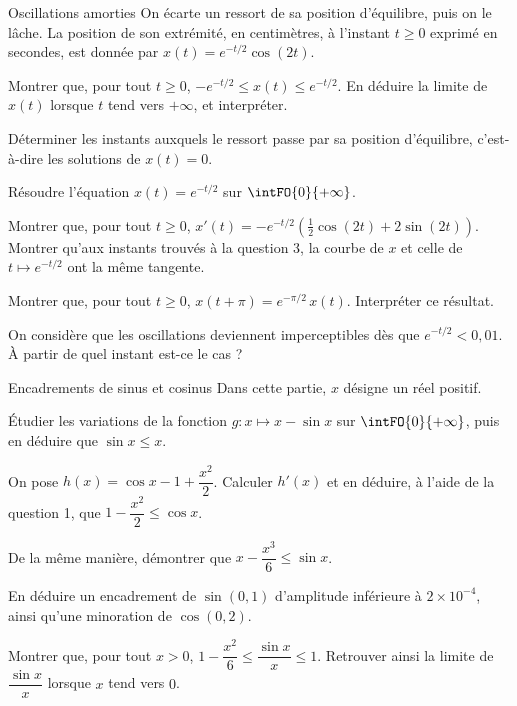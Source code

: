 \begin{exercice}[3]{Oscillations amorties}
On écarte un ressort de sa position d'équilibre, puis on le lâche. La position de son extrémité, en centimètres, à
l'instant $t\geq0$ exprimé en secondes, est donnée par $x(t)=e^{-t/2}\cos(2t)$.
\begin{questions}
  \item Montrer que, pour tout $t\geq0$, $-e^{-t/2}\leq x(t)\leq e^{-t/2}$. En déduire la limite de $x(t)$ lorsque $t$ tend vers $+\infty$, et interpréter.
  \item Déterminer les instants auxquels le ressort passe par sa position d'équilibre, c'est-à-dire les solutions de $x(t)=0$.
  \item Résoudre l'équation $x(t)=e^{-t/2}$ sur $\intFO{0}{+\infty}$.
\end{questions}
\begin{questions}[resume]
  \item Montrer que, pour tout $t\geq0$, $x'(t)=-e^{-t/2}\left(\frac12\cos(2t)+2\sin(2t)\right)$. Montrer qu'aux instants trouvés
    à la question 3, la courbe de $x$ et celle de $t\mapsto e^{-t/2}$ ont la même tangente.
  \item Montrer que, pour tout $t\geq0$, $x(t+\pi)=e^{-\pi/2}\,x(t)$. Interpréter ce résultat.
  \item On considère que les oscillations deviennent imperceptibles dès que $e^{-t/2}<0{,}01$. À partir de quel instant est-ce le cas ?
\end{questions}
\end{exercice}

\begin{exercice}[3]{Encadrements de sinus et cosinus}
Dans cette partie, $x$ désigne un réel positif.
\begin{questions}
  \item Étudier les variations de la fonction $g:x\mapsto x-\sin x$ sur $\intFO{0}{+\infty}$, puis en déduire que $\sin x\leq x$.
  \item On pose $h(x)=\cos x-1+\dfrac{x^{2}}{2}$. Calculer $h'(x)$ et en déduire, à l'aide de la question 1, que
    $1-\dfrac{x^{2}}{2}\leq\cos x$.
  \item De la même manière, démontrer que $x-\dfrac{x^{3}}{6}\leq\sin x$.
\end{questions}
\begin{questions}[resume]
  \item En déduire un encadrement de $\sin(0{,}1)$ d'amplitude inférieure à $2\times10^{-4}$, ainsi qu'une minoration de $\cos(0{,}2)$.
  \item Montrer que, pour tout $x>0$, $1-\dfrac{x^{2}}{6}\leq\dfrac{\sin x}{x}\leq1$. Retrouver ainsi la limite de $\dfrac{\sin x}{x}$
    lorsque $x$ tend vers $0$.
\end{questions}
\end{exercice}
